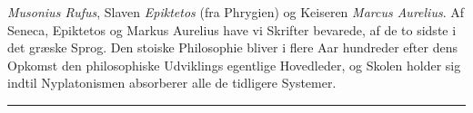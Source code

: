 \documentclass[12pt,a4paper]{book}
\newcommand{\divrule}{\begin{center}\rule{2cm}{0.4pt}\end{center}}
\begin{document}
\emph{Musonius Rufus}, Slaven \emph{Epiktetos} (fra Phrygien) og
Keiseren \emph{Marcus Aurelius}. Af Seneca, Epiktetos og
Markus Aurelius have vi Skrifter bevarede, af de to sidste i
det græske Sprog. Den stoiske Philosophie bliver i flere Aar\-%
hundreder efter dens Opkomst den philosophiske Udviklings
egentlige Hovedleder, og Skolen holder sig indtil Nyplatonismen
absorberer alle de tidligere Systemer.
\divrule
\end{document}
